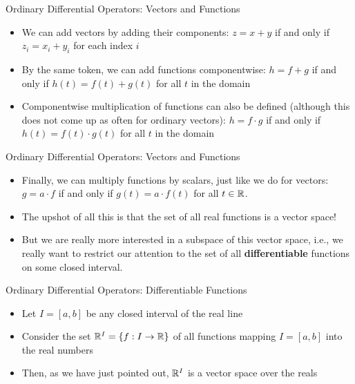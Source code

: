 \begin{frame}
Ordinary Differential Operators: Vectors and Functions

\begin{itemize}
  
\item We can add vectors by adding their components: $z=x+y$ if and only if 
$z_i=x_i+y_i$ for each index $i$
  
\item By the same token, we can add functions componentwise:
  $h=f+g$ if and only 
if $h(t)=f(t)+g(t)$ for all $t$ in the domain
  
\item Componentwise multiplication of functions can also be defined 
(although this does not come up as often for ordinary vectors):  $h=f\cdot g$ if 
and only if $h(t)=f(t)\cdot g(t)$ for all $t$ in the domain

\end{itemize} 

\end{frame}



\begin{frame}
Ordinary Differential Operators: Vectors and Functions

\begin{itemize}
  
\item Finally, we can multiply functions by scalars, just like we do for vectors:  
$g=a\cdot f$ if and only if $g(t)=a\cdot f(t)$ for all $t\in\mathbb{R}$.
  
\item The upshot of all this is that the set of all real functions is a vector space!
  
\item But we are really more interested in a subspace of this vector space, i.e., we really want to 
restrict our attention to the set of all \textbf{differentiable} functions on some closed interval.

\end{itemize} 

\end{frame}


\begin{frame}
Ordinary Differential Operators: Differentiable Functions

\begin{itemize}
  
\item Let $I=[a,b]$ be any closed interval of the real line
  
\item Consider the set $\mathbb{R}^I=\left\{f:I\rightarrow \mathbb{R}\right\}$ of all functions mapping $I=[a,b]$ into the real numbers
  
\item Then, as we have just pointed out, $\mathbb{R}^I$ is a vector space over the reals

\end{itemize} 

\end{frame}



